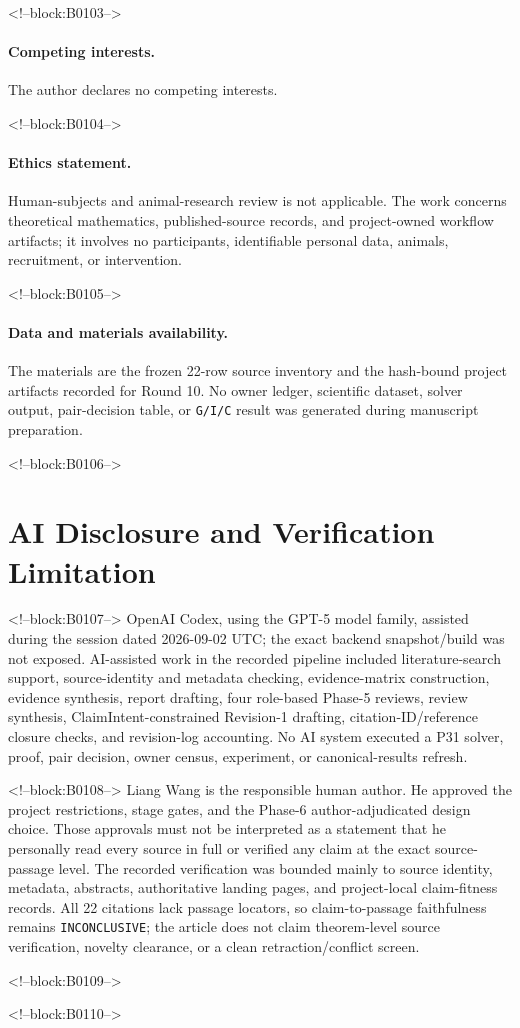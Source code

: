 \documentclass[11pt]{article}
\begin{document}
<!--block:B0103-->
\paragraph{Competing interests.} The author declares no competing
interests.

<!--block:B0104-->
\paragraph{Ethics statement.} Human-subjects and animal-research review
is not applicable. The work concerns theoretical mathematics,
published-source records, and project-owned workflow artifacts; it
involves no participants, identifiable personal data, animals,
recruitment, or intervention.

<!--block:B0105-->
\paragraph{Data and materials availability.} The materials are the
frozen 22-row source inventory and the hash-bound project artifacts
recorded for Round 10. No owner ledger, scientific dataset, solver
output, pair-decision table, or \texttt{G/I/C} result was generated during
manuscript preparation.

<!--block:B0106-->
\hypertarget{ai-disclosure-and-verification-limitation}{%
\section*{AI Disclosure and Verification
Limitation}\label{ai-disclosure-and-verification-limitation}}

<!--block:B0107-->
OpenAI Codex, using the GPT-5 model family, assisted during the session
dated 2026-09-02 UTC; the exact backend snapshot/build was not exposed.
AI-assisted work in the recorded pipeline included literature-search
support, source-identity and metadata checking, evidence-matrix
construction, evidence synthesis, report drafting, four role-based
Phase-5 reviews, review synthesis, ClaimIntent-constrained Revision-1
drafting, citation-ID/reference closure checks, and revision-log
accounting. No AI system executed a P31 solver, proof, pair decision,
owner census, experiment, or canonical-results refresh.

<!--block:B0108-->
Liang Wang is the responsible human author. He approved the project
restrictions, stage gates, and the Phase-6 author-adjudicated design
choice. Those approvals must not be interpreted as a statement that he
personally read every source in full or verified any claim at the exact
source-passage level. The recorded verification was bounded mainly to
source identity, metadata, abstracts, authoritative landing pages, and
project-local claim-fitness records. All 22 citations lack passage
locators, so claim-to-passage faithfulness remains
\texttt{INCONCLUSIVE}; the article does not claim theorem-level source
verification, novelty clearance, or a clean retraction/conflict screen.

<!--block:B0109-->



<!--block:B0110-->
\end{document}

